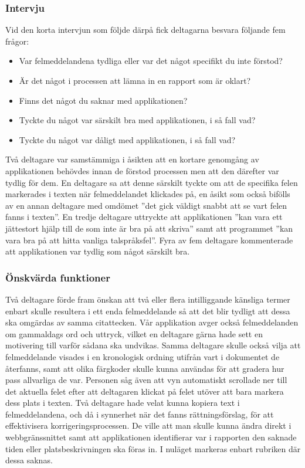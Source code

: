 \documentclass[swedish]{maucsthesis}
\begin{document}
\subsubsection{Intervju}

Vid den korta intervjun som följde därpå fick deltagarna besvara följande fem
frågor:
\begin{itemize}
\item Var felmeddelandena tydliga eller var det något specifikt du inte förstod?
\item Är det något i processen att lämna in en rapport som är oklart?
\item Finns det något du saknar med applikationen?
\item Tyckte du något var särskilt bra med applikationen, i så fall vad?
\item Tyckte du något var dåligt med applikationen, i så fall vad?
\end{itemize}

Två deltagare var samstämmiga i åsikten att en kortare genomgång av
applikationen behövdes innan de förstod processen men att den därefter var
tydlig för dem. En deltagare sa att denne särskilt tyckte om att de specifika
felen markerades i texten när felmeddelandet klickades på, en åsikt som också
bifölls av en annan deltagare med omdömet ”det gick väldigt snabbt att se vart
felen fanns i texten”. En tredje deltagare uttryckte att applikationen ”kan vara
ett jättestort hjälp till de som inte är bra på att skriva” samt att programmet
”kan vara bra på att hitta vanliga talspråksfel”. Fyra av fem deltagare
kommenterade att applikationen var tydlig som något särskilt bra.

\subsubsection{Önskvärda funktioner}\label{önskvärdafunktioner}

Två deltagare förde fram önskan att två eller flera intilliggande känsliga
termer enbart skulle resultera i ett enda felmeddelande så att det blir tydligt
att dessa ska omgärdas av samma citattecken. Vår applikation avger också
felmeddelanden om gammaldags ord och uttryck, vilket en deltagare gärna hade
sett en motivering till varför sådana ska undvikas. Samma deltagare skulle också
vilja att felmeddelande visades i en kronologisk ordning utifrån vart i
dokumentet de återfanns, samt att olika färgkoder skulle kunna användas för att
gradera hur pass allvarliga de var. Personen såg även att vyn automatiskt
scrollade ner till det aktuella felet efter att deltagaren klickat på felet
utöver att bara markera dess plats i texten. Två deltagare hade velat kunna
kopiera text i felmeddelandena, och då i synnerhet när det fanns
rättningsförslag, för att effektivisera korrigeringsprocessen. De ville att man
skulle kunna ändra direkt i webbgränssnittet samt att applikationen identifierar
var i rapporten den saknade tiden eller platsbeskrivningen ska föras in. I
nuläget markeras enbart rubriken där dessa saknas.
\end{document}

